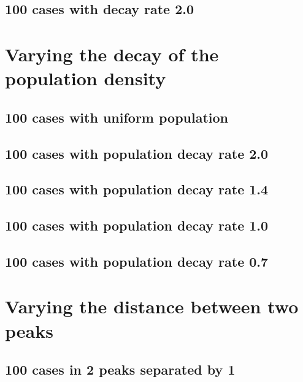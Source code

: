 \subsection{100 cases with decay rate 2.0}


\section{Varying the decay of the population density}

\subsection{100 cases with uniform population}


\subsection{100 cases with population decay rate 2.0}


\subsection{100 cases with population decay rate 1.4}


\subsection{100 cases with population decay rate 1.0}


\subsection{100 cases with population decay rate 0.7}


\section{Varying the distance between two peaks}

\subsection{100 cases in 2 peaks separated by 1}


